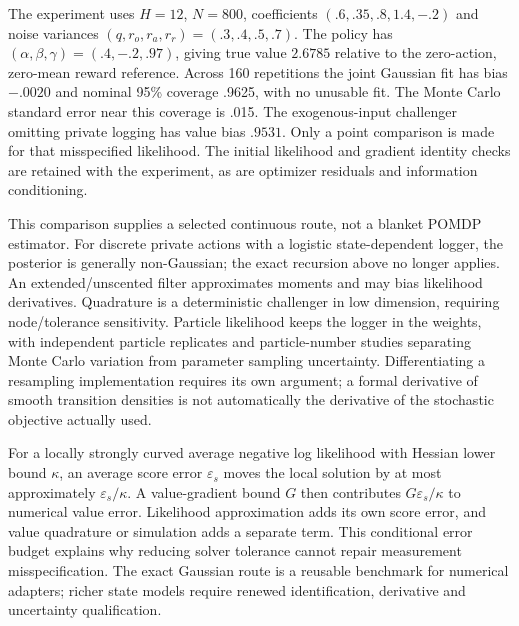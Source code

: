 The experiment uses $H=12$, $N=800$, coefficients
$(.6,.35,.8,1.4,-.2)$ and noise variances $(q,r_o,r_a,r_r)=(.3,.4,.5,.7)$.
The policy has $(\alpha,\beta,\gamma)=(.4,-.2,.97)$, giving true value
$2.6785$ relative to the zero-action, zero-mean reward reference. Across
160 repetitions the joint Gaussian fit has bias $-.0020$ and nominal 95\%
coverage .9625, with no unusable fit. The Monte Carlo standard error near
this coverage is .015. The exogenous-input challenger omitting private
logging has value bias $.9531$. Only a point comparison is made for that
misspecified likelihood. The initial likelihood and gradient identity checks
are retained with the experiment, as are optimizer residuals and information
conditioning.

This comparison supplies a selected continuous route, not a blanket POMDP
estimator. For discrete private actions with a logistic state-dependent
logger, the posterior is generally non-Gaussian; the exact recursion above
no longer applies. An extended/unscented filter approximates moments and
may bias likelihood derivatives. Quadrature is a deterministic challenger
in low dimension, requiring node/tolerance sensitivity. Particle likelihood
keeps the logger in the weights, with independent particle replicates and
particle-number studies separating Monte Carlo variation from parameter
sampling uncertainty. Differentiating a resampling implementation requires
its own argument; a formal derivative of smooth transition densities is
not automatically the derivative of the stochastic objective actually used.

For a locally strongly curved average negative log likelihood with Hessian
lower bound $\kappa$, an average score error $\varepsilon_s$ moves the local
solution by at most approximately $\varepsilon_s/\kappa$. A value-gradient
bound $G$ then contributes $G\varepsilon_s/\kappa$ to numerical value error.
Likelihood approximation adds its own score error, and value quadrature or
simulation adds a separate term. This conditional error budget explains why
reducing solver tolerance cannot repair measurement misspecification. The
exact Gaussian route is a reusable benchmark for numerical adapters; richer
state models require renewed identification, derivative and uncertainty
qualification.




